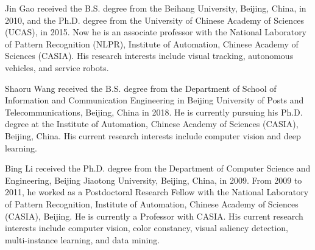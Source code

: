 \documentclass[journal]{IEEEtran}
\begin{document}
\begin{IEEEbiography}
{Jin Gao}
received the B.S. degree from the Beihang University, Beijing, China, in 2010, and the Ph.D. degree from the University of Chinese Academy of Sciences (UCAS), in 2015. Now he is an associate professor with the National Laboratory of Pattern Recognition (NLPR), Institute of Automation, Chinese Academy of Sciences (CASIA). His research interests include visual tracking, autonomous vehicles, and service robots.
\end{IEEEbiography}
\vspace{-5mm}

\begin{IEEEbiography}
{Shaoru Wang}
received the B.S. degree from the Department of School of Information and Communication Engineering in Beijing University of Posts and Telecommunications, Beijing, China in 2018. He is currently pursuing his Ph.D. degree at the Institute of Automation, Chinese Academy of Sciences (CASIA), Beijing, China. His current research interests include computer vision and deep learning.
\end{IEEEbiography}
\vspace{-5mm}

\begin{IEEEbiography}
{Bing Li}
received the Ph.D. degree from the Department of Computer Science and Engineering, Beijing Jiaotong University, Beijing, China, in 2009. From 2009 to 2011, he worked as a Postdoctoral Research Fellow with the National Laboratory of Pattern Recognition, Institute of Automation, Chinese Academy of Sciences (CASIA), Beijing. He is currently a Professor with CASIA. His current research interests include computer vision, color constancy, visual saliency detection, multi-instance learning, and data mining.
\end{IEEEbiography}
\vspace{-5mm}
\end{document}
